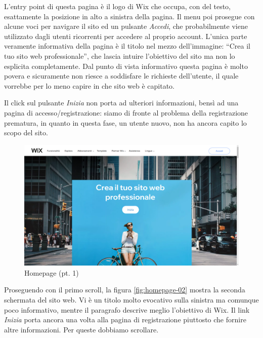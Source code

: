 \documentclass[11pt,a4paper]{article}
\newcommand*{\wix}{Wix}
\begin{document}
L'entry point di questa pagina è il logo di \wix{} che occupa, con del
testo, esattamente la posizione in alto a sinistra della pagina. Il
menu poi prosegue con alcune voci per navigare il sito ed un pulsante
\textit{Accedi}, che probabilmente viene utilizzato dagli utenti
ricorrenti per accedere al proprio account. L'unica parte veramente
informativa della pagina è il titolo nel mezzo dell'immagine: ``Crea
il tuo sito web professionale'', che lascia intuire l'obiettivo del
sito ma non lo esplicita completamente. Dal punto di vista informativo
questa pagina è molto povera e sicuramente non riesce a soddisfare le
richieste dell'utente, il quale vorrebbe per lo meno capire in che
sito web è capitato.

Il click sul pulsante \textit{Inizia} non porta ad ulteriori
informazioni, bensì ad una pagina di accesso/registrazione: siamo di
fronte al problema della registrazione prematura, in quanto in questa
fase, un utente nuovo, non ha ancora capito lo scopo del sito.

\begin{figure}[H]
  \centering
  \includegraphics[width=1\textwidth]{img/homepage-01.png}
  \caption{Homepage (pt. 1)}
  \label{fig:homepage-01}
\end{figure}

Proseguendo con il primo scroll, la figura \ref{fig:homepage-02}
mostra la seconda schermata del sito web. Vi è un titolo molto
evocativo sulla sinistra ma comunque poco informativo, mentre il
paragrafo descrive meglio l'obiettivo di \wix{}. Il link
\textit{Inizia} porta ancora una volta alla pagina di registrazione
piuttosto che fornire altre informazioni. Per queste dobbiamo
scrollare.
\end{document}

